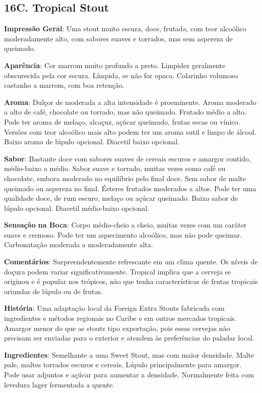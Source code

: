 \subsection*{16C. Tropical Stout}

\textbf{Impressão Geral}: Uma stout muito escura, doce, frutada, com teor alcoólico moderadamente alto, com sabores suaves e torrados, mas sem aspereza de queimado.

\textbf{Aparência}: Cor marrom muito profundo a preto. Limpidez geralmente obscurecida pela cor escura. Límpida, se não for opaca. Colarinho volumoso castanho a marrom, com boa retenção.

\textbf{Aroma}: Dulçor de moderada a alta intensidade é proeminente. Aroma moderado a alto de café, chocolate ou torrado, mas não queimado. Frutado médio a alto. Pode ter aroma de melaço, alcaçuz, açúcar queimado, frutas secas ou vínico. Versões com teor alcoólico mais alto podem ter um aroma sutil e limpo de álcool. Baixo aroma de lúpulo opcional. Diacetil baixo opcional.

\textbf{Sabor}: Bastante doce com sabores suaves de cereais escuros e amargor contido, médio-baixo a médio. Sabor suave e torrado, muitas vezes como café ou chocolate, embora moderado no equilíbrio pelo final doce. Sem sabor de malte queimado ou aspereza no final. Ésteres frutados moderados a altos. Pode ter uma qualidade doce, de rum escuro, melaço ou açúcar queimado. Baixo sabor de lúpulo opcional. Diacetil médio-baixo opcional.

\textbf{Sensação na Boca}: Corpo médio-cheio a cheio, muitas vezes com um caráter suave e cremoso. Pode ter um aquecimento alcoólico, mas não pode queimar. Carbonatação moderada a moderadamente alta.

\textbf{Comentários}: Surpreendentemente refrescante em um clima quente. Os níveis de doçura podem variar significativamente. Tropical implica que a cerveja se originou e é popular nos trópicos, não que tenha características de frutas tropicais oriundas de lúpulo ou de frutas.

\textbf{História}: Uma adaptação local da Foreign Extra Stouts fabricada com ingredientes e métodos regionais no Caribe e em outros mercados tropicais. Amargor menor do que as stouts tipo exportação, pois essas cervejas não precisam ser enviadas para o exterior e atendem às preferências do paladar local.

\textbf{Ingredientes}: Semelhante a uma Sweet Stout, mas com maior densidade. Malte pale, maltes torrados escuros e cereais. Lúpulo principalmente para amargor. Pode usar adjuntos e açúcar para aumentar a densidade. Normalmente feita com levedura lager fermentada a quente.

